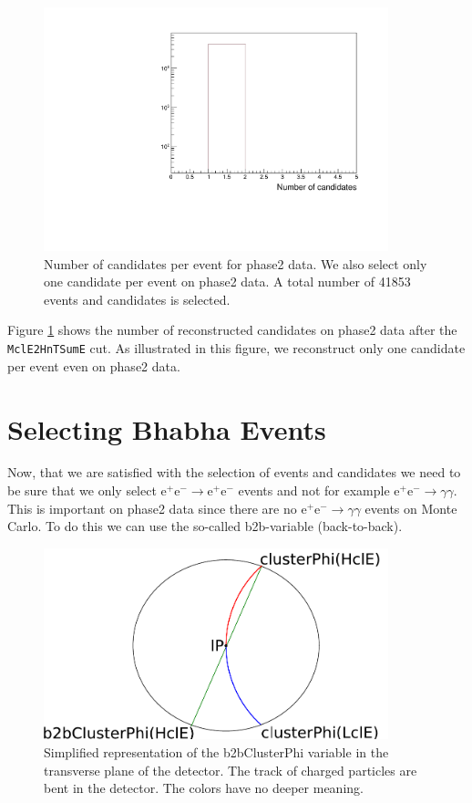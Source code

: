 \documentclass[a4paper,11pt,twosided,final,german,openbib,pdftex,listof=totoc,bibliography=totoc]{scrbook}
\begin{document}
\begin{figure}[h!]
	\centering
	\includegraphics[width=10cm]{Cuts/Data/nCandData.pdf}
	\caption[Number Of Candidates Per Event for Phase2 Data (All Cuts)]{Number of candidates per event for phase2 data. We also select only one candidate per event on phase2 data. A total number of 41853 events and candidates is selected.}
	\label{fig:nCandData}
\end{figure}

Figure \ref{fig:nCandData} shows the number of reconstructed candidates on phase2 data after the \texttt{MclE2HnTSumE} cut. As illustrated in this figure, we reconstruct only one candidate per event even on phase2 data.



\section{Selecting Bhabha Events}
\label{sec:SelectingElectronPositron}

Now, that we are satisfied with the selection of events and candidates we need to be sure that we only select $\textrm{e}^+ \textrm{e}^- \rightarrow \textrm{e}^+ \textrm{e}^-$ events and not for example $\textrm{e}^+ \textrm{e}^- \rightarrow \gamma \gamma$. This is important on phase2 data since there are no $\textrm{e}^+ \textrm{e}^- \rightarrow \gamma \gamma$ events on Monte Carlo. To do this we can use the so-called b2b-variable (back-to-back).

\begin{figure}[h!]
	\centering
	\includegraphics[width=10cm]{Bilder/b2b_2}
	\caption[Sketch Of The b2bClusterPhi Variable]{Simplified representation of the b2bClusterPhi variable in the transverse plane of the detector. The track of charged particles are bent in the detector. The colors have no deeper meaning.}
	\label{fig:Sketchb2b}
\end{figure}
\end{document}
